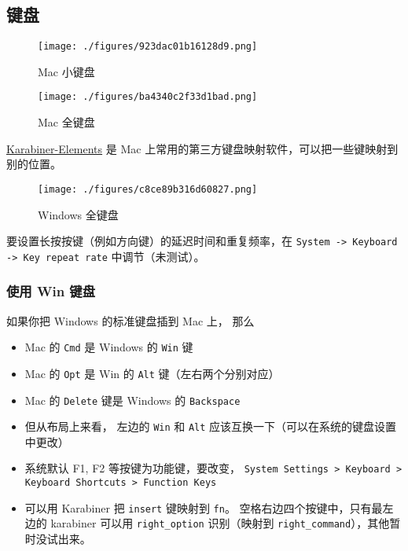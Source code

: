 
\subsection{键盘}

\begin{figure}[ht]
\centering
\texttt{[image: ./figures/923dac01b16128d9.png]}
\caption{Mac 小键盘} \label{fig_MacNt_5}
\end{figure}

\begin{figure}[ht]
\centering
\texttt{[image: ./figures/ba4340c2f33d1bad.png]}
\caption{Mac 全键盘} \label{fig_MacNt_4}
\end{figure}

\href{https://karabiner-elements.pqrs.org/}{Karabiner-Elements} 是 Mac 上常用的第三方键盘映射软件，可以把一些键映射到别的位置。

\begin{figure}[ht]
\centering
\texttt{[image: ./figures/c8ce89b316d60827.png]}
\caption{Windows 全键盘} \label{fig_MacNt_3}
\end{figure}

要设置长按按键（例如方向键）的延迟时间和重复频率，在 \verb`System -> Keyboard -> Key repeat rate` 中调节（未测试）。

\subsubsection{使用 Win 键盘}
如果你把 Windows 的标准键盘插到 Mac 上， 那么
\begin{itemize}
\item Mac 的 \verb|Cmd| 是 Windows 的 \verb|Win| 键
\item Mac 的 \verb|Opt| 是 Win 的 \verb|Alt| 键（左右两个分别对应）
\item Mac 的 \verb|Delete| 键是 Windows 的 \verb|Backspace|
\item 但从布局上来看， 左边的 \verb|Win| 和 \verb|Alt| 应该互换一下（可以在系统的键盘设置中更改）
\item 系统默认 F1, F2 等按键为功能键，要改变， \verb`System Settings > Keyboard > Keyboard Shortcuts > Function Keys`
\item 可以用 Karabiner 把 \verb`insert` 键映射到 \verb`fn`。 空格右边四个按键中，只有最左边的 karabiner 可以用 \verb`right_option` 识别（映射到 \verb`right_command`），其他暂时没试出来。
\end{itemize}

